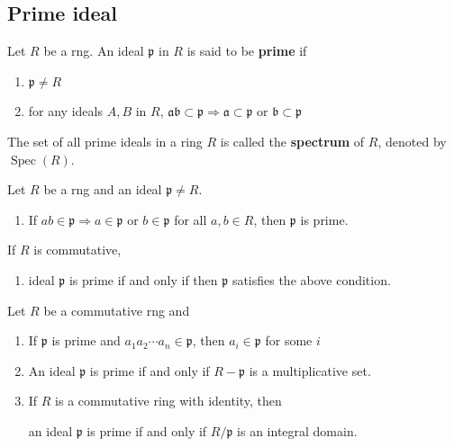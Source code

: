 \subsection{Prime ideal} %
\begin{definition}
    Let $R$ be a rng.
    An ideal $\mathfrak{p}$ in $R$ is said to be \textbf{prime} if
    \begin{enumerate}[label=(\roman*)]
        \item
              $\mathfrak{p} \neq {R}$
        \item
              for any ideals $A, B$ in $R$,
              $\mathfrak{a} \mathfrak{b} \subset \mathfrak{p}\Rightarrow \mathfrak{a} \subset\mathfrak{p} \text { or } \mathfrak{b} \subset \mathfrak{p}$
    \end{enumerate}
    The set of all prime ideals in a ring $R$ is called the \textbf{spectrum} of $R$, denoted by $\operatorname{Spec}(R)$.
\end{definition}

\begin{theorem}
    \label{thm: Prime ideal}
    Let $R$ be a rng and an ideal $\mathfrak{p} \neq R$.
    \begin{enumerate}
        \item
              If $a b \in \mathfrak{p} \Rightarrow a \in \mathfrak{p}\text { or  } b \in \mathfrak{p}$ for all $a,b\in R$, then $\mathfrak{p}$ is prime.
    \end{enumerate}
    If $R$ is commutative,
    \begin{enumerate}[resume]
        \item ideal $\mathfrak{p}$ is prime if and only if then $\mathfrak{p}$ satisfies the above condition.
    \end{enumerate}
\end{theorem}

\begin{corollary}
    \label{cor: Prime ideal}
    Let $R$ be a commutative rng and
    \begin{enumerate}
        \item If $\mathfrak{p}$ is prime and $a_1a_2\cdots a_n \in \mathfrak{p}$, then $a_i\in \mathfrak{p}$ for some $i$

        \item An ideal $\mathfrak{p}$ is prime if and only if $R-\mathfrak{p}$ is a multiplicative set.

        \item   If $R$ is a commutative ring with identity, then
              \begin{center}
                  an ideal $\mathfrak{p}$ is prime if and only if ${R} / \mathfrak{p} $ is an integral domain.
              \end{center}
    \end{enumerate}
\end{corollary}


